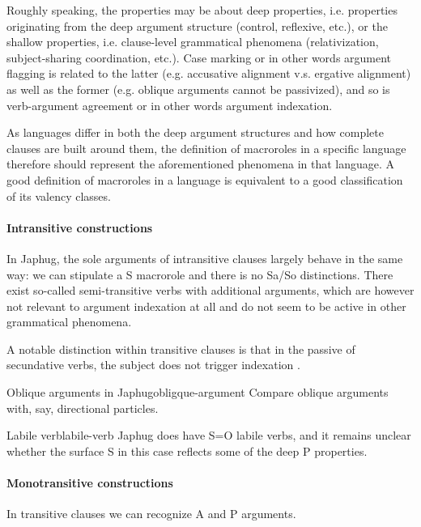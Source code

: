 \documentclass[a4paper, oneside, 12pt]{report}
\newcommand*{\citesec}[1]{\S~{#1}}
\begin{document}
Roughly speaking, the properties may be about deep properties, 
i.e. properties originating from the deep argument structure
(control, reflexive, etc.), 
or the shallow properties, i.e. clause-level grammatical phenomena
(relativization, subject-sharing coordination, etc.).
Case marking or in other words argument flagging 
is related to the latter (e.g. accusative alignment v.s. ergative alignment)
as well as the former (e.g. oblique arguments cannot be passivized),
and so is verb-argument agreement or in other words argument indexation.

As languages differ in both the deep argument structures
and how complete clauses are built around them,
the definition of macroroles in a specific language therefore should represent 
the aforementioned phenomena in that language.
A good definition of macroroles in a language
is equivalent to a good classification of its valency classes.

\paragraph*{Intransitive constructions}
In Japhug, the sole arguments of intransitive clauses largely behave in the same way:
we can stipulate a S macrorole and there is no Sa/So distinctions. 
There exist so-called semi-transitive verbs with additional arguments,
which are however not relevant to argument indexation at all
\citep[\citesec{14.2.5}]{jacques2021grammar}
and do not seem to be active in other grammatical phenomena.

A notable distinction within transitive clauses
is that in the passive of secundative verbs,
the subject does not trigger indexation
\citep[\citesec{18.1.4}]{jacques2021grammar}.

\begin{todobox}{Oblique arguments in Japhug}{obligque-argument}
    Compare oblique arguments with, say, directional particles.
\end{todobox}

\begin{todobox}{Labile verb}{labile-verb}
    Japhug does have S=O labile verbs,
    and it remains unclear whether the surface S in this case
    reflects some of the deep P properties. 
\end{todobox}

\paragraph*{Monotransitive constructions}
\label{sec:grammatical.clause.internal.monotransitive}
In transitive clauses we can recognize A and P arguments.
\end{document}
